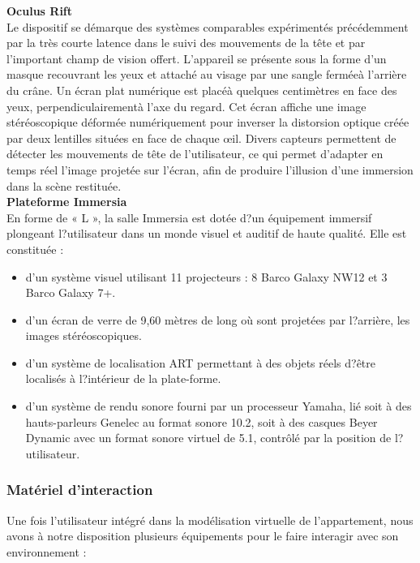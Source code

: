 \textbf{Oculus Rift}
\\

Le dispositif se d\'emarque des syst\`emes comparables exp\'eriment\'es pr\'ec\'edemment par la tr\`es courte latence dans le suivi des mouvements de la t\^ete et par l'important champ de vision offert. L'appareil se pr\'esente sous la forme d'un masque recouvrant les yeux et attach\'e au visage par une sangle ferm\'ee\`a l'arri\`ere du cr\^ane. Un \'ecran plat num\'erique est plac\'e\`a quelques centim\`etres en face des yeux, perpendiculairement\`a l'axe du regard. Cet \'ecran affiche une image st\'er\'eoscopique d\'eform\'ee num\'eriquement pour inverser la distorsion optique cr\'e\'ee par deux lentilles situ\'ees en face de chaque œil. Divers capteurs permettent de d\'etecter les mouvements de t\^ete de l'utilisateur, ce qui permet d'adapter en temps r\'eel l'image projet\'ee sur l'\'ecran, afin de produire l'illusion d'une immersion dans la sc\`ene restitu\'ee.
\\

\textbf{Plateforme Immersia}
\\

En forme de « L », la salle Immersia est dot\'ee d?un \'equipement immersif plongeant l?utilisateur dans un monde visuel et auditif de haute qualit\'e. 
Elle est constitu\'ee  :
\begin{itemize}
  \item d'un syst\`eme visuel utilisant 11 projecteurs : 8 Barco Galaxy NW12 et 3 Barco Galaxy 7+.
  \item d'un \'ecran de verre de 9,60 m\`etres de long o\`u sont projet\'ees par l?arri\`ere, les images st\'er\'eoscopiques.
  \item d'un syst\`eme de localisation ART permettant \`a des objets r\'eels d?\^etre localis\'es \`a l?int\'erieur de la plate-forme.
  \item d'un syst\`eme de rendu sonore fourni par un processeur Yamaha, li\'e soit \`a des hauts-parleurs Genelec au format sonore 10.2, soit \`a des casques Beyer Dynamic avec un format sonore virtuel de 5.1, contrôl\'e par la position de l?utilisateur.
\end{itemize}

\subsubsection{Mat\'eriel d'interaction}
Une fois l'utilisateur int\'egr\'e dans la mod\'elisation virtuelle de l'appartement, nous avons \`a notre disposition plusieurs \'equipements pour le faire interagir avec son environnement :
\\


